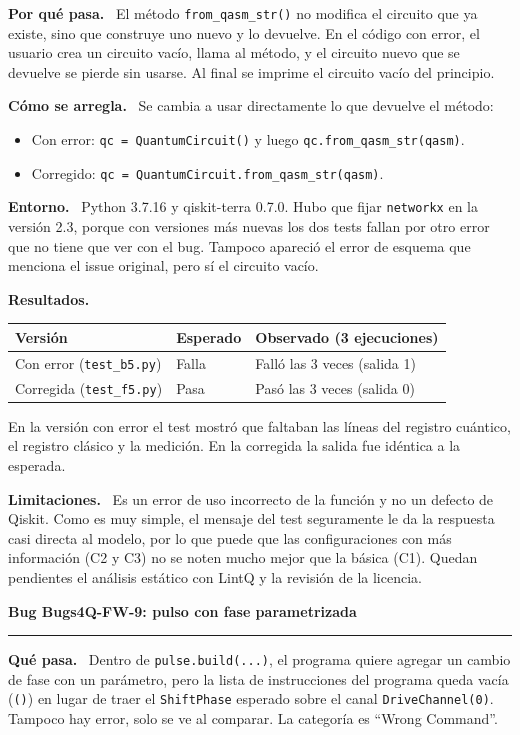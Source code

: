 \documentclass[11pt,a4paper]{article}
\newcommand{\paper}[1]{\vspace{1.2em}\par{\large\textbf{#1}}\par\vspace{0.2em}\hrule\vspace{0.4em}}
\newcommand{\parte}[1]{\par\textbf{#1.}\ }
\begin{document}
\parte{Por qué pasa}
El método \texttt{from\_qasm\_str()} no modifica el circuito que ya existe, sino que construye uno nuevo y lo devuelve. En el código con error, el usuario crea un circuito vacío, llama al método, y el circuito nuevo que se devuelve se pierde sin usarse. Al final se imprime el circuito vacío del principio.

\parte{Cómo se arregla}
Se cambia a usar directamente lo que devuelve el método:
\begin{itemize}
  \item Con error: \texttt{qc = QuantumCircuit()} y luego \texttt{qc.from\_qasm\_str(qasm)}.
  \item Corregido: \texttt{qc = QuantumCircuit.from\_qasm\_str(qasm)}.
\end{itemize}

\parte{Entorno}
Python 3.7.16 y qiskit-terra 0.7.0. Hubo que fijar \texttt{networkx} en la versión 2.3, porque con versiones más nuevas los dos tests fallan por otro error que no tiene que ver con el bug. Tampoco apareció el error de esquema que menciona el issue original, pero sí el circuito vacío.

\parte{Resultados}
\begin{center}
\begin{tabular}{lll}
\toprule
Versión & Esperado & Observado (3 ejecuciones) \\
\midrule
Con error (\texttt{test\_b5.py}) & Falla & Falló las 3 veces (salida 1) \\
Corregida (\texttt{test\_f5.py}) & Pasa & Pasó las 3 veces (salida 0) \\
\bottomrule
\end{tabular}
\end{center}
En la versión con error el test mostró que faltaban las líneas del registro cuántico, el registro clásico y la medición. En la corregida la salida fue idéntica a la esperada.

\parte{Limitaciones}
Es un error de uso incorrecto de la función y no un defecto de Qiskit. Como es muy simple, el mensaje del test seguramente le da la respuesta casi directa al modelo, por lo que puede que las configuraciones con más información (C2 y C3) no se noten mucho mejor que la básica (C1). Quedan pendientes el análisis estático con LintQ y la revisión de la licencia.

\paper{Bug Bugs4Q-FW-9: pulso con fase parametrizada}

\parte{Qué pasa}
Dentro de \texttt{pulse.build(...)}, el programa quiere agregar un cambio de fase con un parámetro, pero la lista de instrucciones del programa queda vacía (\texttt{()}) en lugar de traer el \texttt{ShiftPhase} esperado sobre el canal \texttt{DriveChannel(0)}. Tampoco hay error, solo se ve al comparar. La categoría es ``Wrong Command''.
\end{document}
